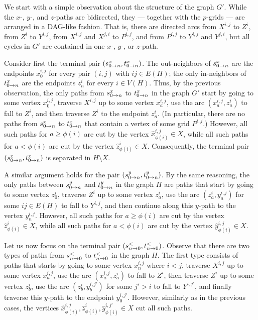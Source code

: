 We start with a simple observation about the structure of the graph $G'$. While
the $x$-, $y$-, and $z$-paths are bidirected, they --- together with the $p$-grids --- are arranged in a DAG-like fashion.
That is, there are directed arcs from $X^{i,j}$ to $Z^i$, from $Z^i$ to $Y^{i,j}$, from $X^{i,j}$ and $X^{j,i}$ to $P^{i,j}$, and from $P^{i,j}$ to $Y^{i,j}$ and $Y^{j,i}$,
but all cycles in $G'$ are contained in one $x$-, $y$-, or $z$-path. 
 
Consider first the terminal pair $(s_{0 \to n}^{x}, t_{0 \to n}^{x})$. The out-neighbors of $s_{0 \to n}^{x}$ are the endpoints $x^{i,j}_0$ for every pair $(i,j)$ with $ij \in E(H)$;
the only in-neighbors of $t_{0 \to n}^{x}$ are the endpoints $z^i_n$ for every $i \in V(H)$.
Thus, by the previous observation, the only paths from $s_{0 \to n}^{x}$ to $t_{0 \to n}^{x}$ in the graph $G'$ start by going to some vertex $x^{i,j}_0$, traverse $X^{i,j}$ up to some vertex $x^{i,j}_a$, use the arc $(x^{i,j}_a,z^i_a)$
to fall to $Z^i$, and then traverse $Z^i$ to the endpoint $z^i_n$. 
(In particular, there are no paths from $s_{0 \to n}^{x}$ to $t_{0 \to n}^{x}$ that contain a vertex of some grid $P^{i,j}$.)
However, all such paths for $a \geq \phi(i)$ are cut
by the vertex $\hat{x}^{i,j}_{\phi(i)} \in X$, while all such paths for $a < \phi(i)$ are cut by the vertex $\hat{z}^i_{\phi(i)} \in X$. Consequently,
the terminal pair $(s_{0 \to n}^{x}, t_{0 \to n}^{x})$ is separated in $H \setminus X$.

A similar argument holds for the pair $(s_{0 \to n}^{y},t_{0 \to n}^{y})$. By the same reasoning, the only paths between $s_{0 \to n}^{y}$ and $t_{0 \to n}^{y}$ in the graph $H$
are paths that start by going to some vertex $z^i_0$, traverse $Z^i$ up to some vertex $z^i_a$, use the arc
$(z^i_a,y^{i,j}_a)$ for some $ij \in E(H)$ to fall to $Y^{i,j}$, and then continue along this $y$-path to the vertex $y^{i,j}_n$.
However, all such paths for $a \geq \phi(i)$ are cut by the vertex $\hat{z}^{i}_{\phi(i)} \in X$, while all such paths for $a < \phi(i)$ are cut by the vertex $\hat{y}^{i,j}_{\phi(i)} \in X$.

Let us now focus on the terminal pair $(s_{n \to 0}^{<},t_{n \to 0}^{<})$. Observe that there are two types of paths from $s_{n \to 0}^{<}$ to $t_{n \to 0}^{<}$ in the graph $H$.
The first type consists of paths that starts by going to some vertex $x^{i,j}_n$ where $i < j$, traverse $X^{i,j}$ up to some vertex $x^{i,j}_a$,
use the arc $(x^{i,j}_a,z^i_a)$ to fall to $Z^i$, then traverse $Z^i$ up to some vertex $z^i_b$, use
the arc $(z^i_b,y^{i,j'}_b)$ for some $j' > i$ to fall to $Y^{i,j'}$, and finally traverse this $y$-path to the endpoint $y^{i,j'}_0$.
However, similarly as in the previous cases, the vertices $\hat{x}^{i,j}_{\phi(i)}, \hat{z}^i_{\phi(i)}, \hat{y}^{i,j'}_{\phi(i)} \in X$ cut all such paths.

